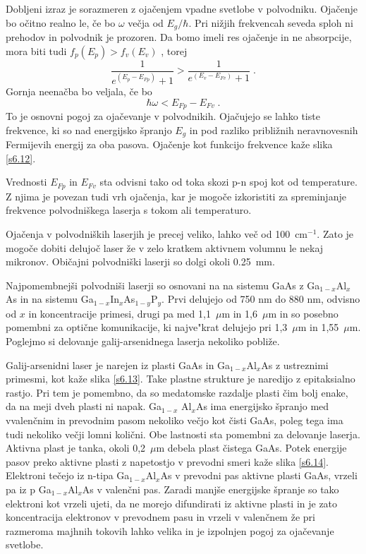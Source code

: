 Dobljeni izraz je sorazmeren z ojačenjem vpadne svetlobe v polvodniku.
Ojačenje bo očitno realno le, če bo $\omega$ večja od $E_g/\hbar$. Pri
nižjih frekvencah seveda sploh ni prehodov in polvodnik je prozoren. Da
bomo imeli res ojačenje in ne absorpcije, mora biti tudi $f_p(E_p)>f_v(E_v)$%
, torej 
\begin{equation}  \label{6.12}
\frac{1}{e^{(E_p-E_{Fp})}+1}>\frac{1}{e^{(E_v-E_{Fv})}+1}\;.
\end{equation}
Gornja neenačba bo veljala, če bo 
\begin{equation}  \label{6.13}
\hbar\omega<E_{Fp}-E_{Fv}\;.
\end{equation}
To je osnovni pogoj za ojačevanje v polvodnikih. Ojačujejo se lahko tiste
frekvence, ki so nad energijsko špranjo $E_g$ in pod razliko približnih
neravnovesnih Fermijevih energij za oba pasova. Ojačenje kot funkcijo
frekvence kaže slika \ref{s6.12}.

Vrednosti $E_{Fp}$ in $E_{Fv}$ sta odvisni tako od toka skozi p-n spoj kot
od temperature. Z njima je povezan tudi vrh ojačenja, kar je mogoče
izkoristiti za spreminjanje frekvence polvodniškega laserja s tokom ali
temperaturo.

Ojačenja v polvodniških laserjih je precej veliko, lahko več od 100~cm$%
^{-1}$. Zato je mogoče dobiti delujoč laser že v zelo kratkem aktivnem
volumnu le nekaj mikronov. Običajni polvodniški laserji so dolgi okoli
0.25~mm.

Najpomembnejši polvodniši laserji so osnovani na na sistemu GaAs z Ga$%
_{1-x}$Al$_{x}$As in na sistemu Ga$_{1- x}$In$_{x}$As$_{1-y}$P$_y$. Prvi
delujejo od 750 nm do 880 nm, odvisno od $x$ in koncentracije primesi, drugi
pa med 1,1~$\mu$m in 1,6~$\mu$m in so posebno pomembni za optične
komunikacije, ki najve"krat delujejo pri 1,3~$\mu$m in 1,55~$\mu$m. Poglejmo
si delovanje galij-arsenidnega laserja nekoliko pobliže.

Galij-arsenidni laser je narejen iz plasti GaAs in Ga$_{1- x}$Al$_x$As z
ustreznimi primesmi, kot kaže slika \ref{s6.13}. Take plastne strukture je
naredijo z epitaksialno rastjo. Pri tem je pomembno, da so medatomske
razdalje plasti čim bolj enake, da na meji dveh plasti ni napak. Ga$_{1-x}$%
Al$_x$As ima energijsko špranjo med vvalenčnim in prevodnim pasom nekoliko
večjo kot čisti GaAs, poleg tega ima tudi nekoliko večji lomni količni.
Obe lastnosti sta pomembni za delovanje laserja. Aktivna plast je tanka,
okoli 0,2~$\mu$m debela plast čistega GaAs. Potek energije pasov preko
aktivne plasti z napetostjo v prevodni smeri kaže slika \ref{s6.14}.
Elektroni tečejo iz n-tipa Ga$_{1-x}$Al$_x$As v prevodni pas aktivne plasti
GaAs, vrzeli pa iz p Ga$_{1-x}$Al$_x$As v valenčni pas. Zaradi manjše
energijske špranje so tako elektroni kot vrzeli ujeti, da ne morejo
difundirati iz aktivne plasti in je zato koncentracija elektronov v
prevodnem pasu in vrzeli v valenčnem že pri razmeroma majhnih tokovih
lahko velika in je izpolnjen pogoj za ojačevanje svetlobe.

